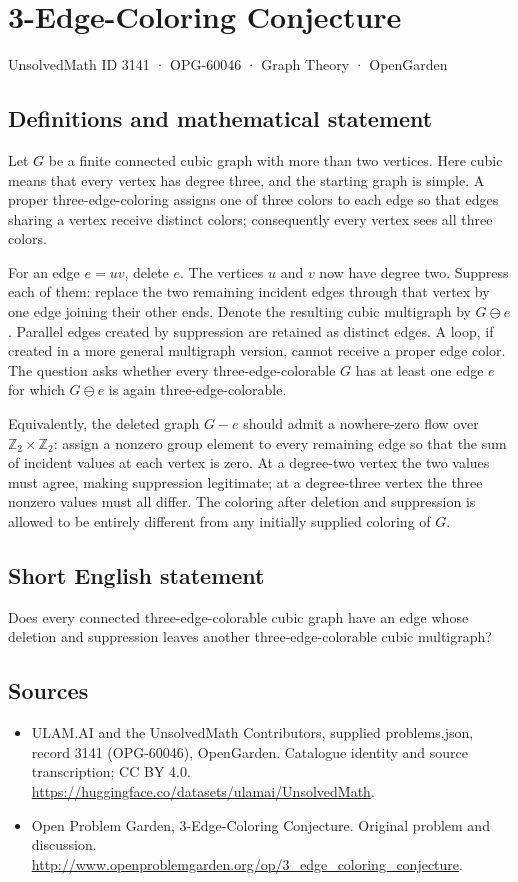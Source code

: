 \documentclass[11pt,a4paper]{article}
\begin{document}
\section*{3-Edge-Coloring Conjecture}\label{3141}
{\small UnsolvedMath ID 3141 · OPG-60046 · Graph Theory · OpenGarden}
\subsection{Definitions and mathematical statement}
Let $G$ be a finite connected cubic graph with more than two vertices. Here cubic means that every vertex has degree three, and the starting graph is simple. A proper three-edge-coloring assigns one of three colors to each edge so that edges sharing a vertex receive distinct colors; consequently every vertex sees all three colors.

For an edge $e=uv$, delete $e$. The vertices $u$ and $v$ now have degree two. Suppress each of them: replace the two remaining incident edges through that vertex by one edge joining their other ends. Denote the resulting cubic multigraph by $G\mathbin{\ominus}e$. Parallel edges created by suppression are retained as distinct edges. A loop, if created in a more general multigraph version, cannot receive a proper edge color. The question asks whether every three-edge-colorable $G$ has at least one edge $e$ for which $G\mathbin{\ominus}e$ is again three-edge-colorable.

Equivalently, the deleted graph $G-e$ should admit a nowhere-zero flow over $\mathbb Z_2\times\mathbb Z_2$: assign a nonzero group element to every remaining edge so that the sum of incident values at each vertex is zero. At a degree-two vertex the two values must agree, making suppression legitimate; at a degree-three vertex the three nonzero values must all differ. The coloring after deletion and suppression is allowed to be entirely different from any initially supplied coloring of $G$.
\subsection{Short English statement}
Does every connected three-edge-colorable cubic graph have an edge whose deletion and suppression leaves another three-edge-colorable cubic multigraph?
\subsection{Sources}
\begin{itemize}
\item[S1] ULAM.AI and the UnsolvedMath Contributors, supplied problems.json, record 3141 (OPG-60046), OpenGarden. Catalogue identity and source transcription; CC BY 4.0.
\url{https://huggingface.co/datasets/ulamai/UnsolvedMath}.
\item[S2] Open Problem Garden, 3-Edge-Coloring Conjecture. Original problem and discussion.
\url{http://www.openproblemgarden.org/op/3_edge_coloring_conjecture}.
\end{itemize}
\end{document}
